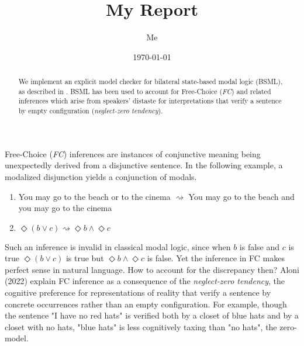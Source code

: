 \documentclass[12pt,a4paper]{article}
\title{My Report}
\author{Me}
\date{\today}
\begin{document}
\maketitle

\begin{abstract}
We implement an explicit model checker for bilateral state-based modal logic
(BSML), as described in \cite{Aloni2024}. BSML has been used to account for
Free-Choice (\textit{FC}) and related inferences which arise from speakers' distaste for
interpretations that verify a sentence by empty configuration  (\textit{neglect-zero tendency}).
\end{abstract}

Free-Choice (\textit{FC}) inferences are instances of conjunctive meaning being unexpectedly
derived from a disjunctive sentence. In the following example, a modalized disjunction yields
a conjunction of modals. 

\begin{enumerate}
\item You may go to the beach or to the cinema $\rightsquigarrow$ You may go to the beach
 and you may go to the cinema
\item $\Diamond(b\vee c)\rightsquigarrow\Diamond b \wedge \Diamond c$
\end{enumerate}


Such an inference is invalid in classical modal logic, since when $b$ is false and $c$ is true $\Diamond(b\vee c)$ is true but
$\Diamond b \wedge \Diamond c$ is false. Yet the inference in FC makes perfect sense in natural language. How
to account for the discrepancy then? Aloni (2022) explain FC inference as a consequence of the \textit{neglect-zero tendency},
the cognitive preference for representations of reality that verify a sentence by concrete occurrences rather
than an empty configuration. For example, though the sentence "I have no red hats" is verified both by a closet
of blue hats and by a closet with no hats, "blue hats" is less cognitively taxing than "no hats", the zero-model.

\tableofcontents

\clearpage














\end{document}
